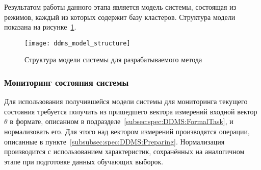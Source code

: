 Результатом работы данного этапа является модель системы, состоящая из режимов, каждый из которых содержит базу кластеров. Структура модели показана на рисунке~\ref{fig:spec:DDMS:ModelStructure}.

\begin{figure}[h]
	\texttt{[image: ddms\_model\_structure]}
	\caption{Структура модели системы для разрабатываемого метода}
	\label{fig:spec:DDMS:ModelStructure}
\end{figure}

\subsubsection{Мониторинг состояния системы}
Для использования получившейся модели системы для мониторинга текущего состояния требуется получить из пришедшего вектора измерений входной вектор $\theta$ в формате, описанном в подразделе~\ref{subsec:spec:DDMS:FormalTask}, и нормализовать его. Для этого над вектором измерений производятся операции, описанные в пункте~\ref{subsubsec:spec:DDMS:Preparing}. Нормализация производится с использованием характеристик, сохранённых на аналогичном этапе при подготовке данных обучающих выборок.


